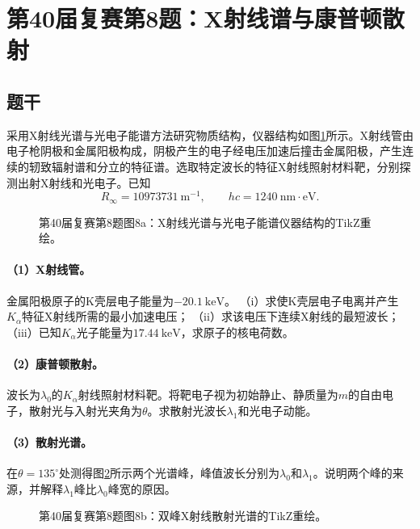 \section{第40届复赛第8题：X射线谱与康普顿散射}

\subsection{题干}
采用X射线光谱与光电子能谱方法研究物质结构，仪器结构如图\ref{fig:cpho40q08a}所示。X射线管由电子枪阴极和金属阳极构成，阴极产生的电子经电压加速后撞击金属阳极，产生连续的轫致辐射谱和分立的特征谱。选取特定波长的特征X射线照射材料靶，分别探测出射X射线和光电子。已知
\[
R_\infty=10973731\ \mathrm{m^{-1}},\qquad hc=1240\ \mathrm{nm\cdot eV}.
\]

\begin{figure}[htbp]
  \centering
  
  \caption{第40届复赛第8题图8a：X射线光谱与光电子能谱仪器结构的TikZ重绘。}
  \label{fig:cpho40q08a}
\end{figure}

\paragraph{（1）X射线管。}
金属阳极原子的K壳层电子能量为$-20.1\ \mathrm{keV}$。
（i）求使K壳层电子电离并产生$K_\alpha$特征X射线所需的最小加速电压；
（ii）求该电压下连续X射线的最短波长；
（iii）已知$K_\alpha$光子能量为$17.44\ \mathrm{keV}$，求原子的核电荷数。

\paragraph{（2）康普顿散射。}
波长为$\lambda_0$的$K_\alpha$射线照射材料靶。将靶电子视为初始静止、静质量为$m$的自由电子，散射光与入射光夹角为$\theta$。求散射光波长$\lambda_1$和光电子动能。

\paragraph{（3）散射光谱。}
在$\theta=135^\circ$处测得图\ref{fig:cpho40q08b}所示两个光谱峰，峰值波长分别为$\lambda_0$和$\lambda_1$。说明两个峰的来源，并解释$\lambda_1$峰比$\lambda_0$峰宽的原因。

\begin{figure}[htbp]
  \centering
  
  \caption{第40届复赛第8题图8b：双峰X射线散射光谱的TikZ重绘。}
  \label{fig:cpho40q08b}
\end{figure}


